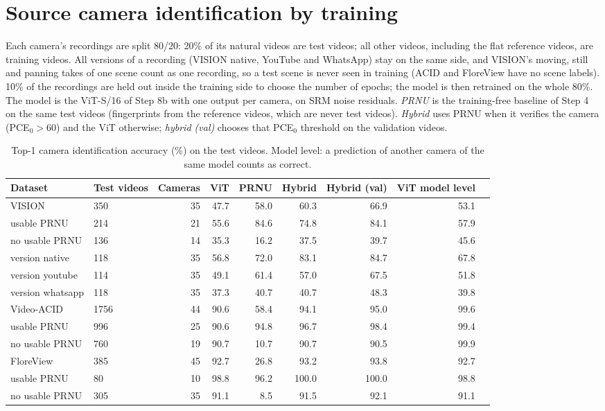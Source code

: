 \documentclass[11pt,a4paper]{article}
\begin{document}
\section{Source camera identification by training}
Each camera's recordings are split 80/20: 20\% of its natural videos are test videos; all other videos, including the flat reference videos, are training videos. All versions of a recording (VISION native, YouTube and WhatsApp) stay on the same side, and VISION's moving, still and panning takes of one scene count as one recording, so a test scene is never seen in training (ACID and FloreView have no scene labels). 10\% of the recordings are held out inside the training side to choose the number of epochs; the model is then retrained on the whole 80\%. The model is the ViT-S/16 of Step 8b with one output per camera, on SRM noise residuals. \emph{PRNU} is the training-free baseline of Step 4 on the same test videos (fingerprints from the reference videos, which are never test videos). \emph{Hybrid} uses PRNU when it verifies the camera (PCE$_0>60$) and the ViT otherwise; \emph{hybrid (val)} chooses that PCE$_0$ threshold on the validation videos.
\begin{table}[H]\centering\small\setlength{\tabcolsep}{4pt}\caption{Top-1 camera identification accuracy (\%) on the test videos. Model level: a prediction of another camera of the same model counts as correct.}\begin{tabular}{llrrrrrrr}\toprule Dataset & Test videos & Cameras & ViT & PRNU & Hybrid & Hybrid (val) & ViT model level \\\midrule
VISION & 350 & 35 & 47.7 & 58.0 & 60.3 & 66.9 & 53.1 \\
\quad usable PRNU & 214 & 21 & 55.6 & 84.6 & 74.8 & 84.1 & 57.9 \\
\quad no usable PRNU & 136 & 14 & 35.3 & 16.2 & 37.5 & 39.7 & 45.6 \\
\quad version native & 118 & 35 & 56.8 & 72.0 & 83.1 & 84.7 & 67.8 \\
\quad version youtube & 114 & 35 & 49.1 & 61.4 & 57.0 & 67.5 & 51.8 \\
\quad version whatsapp & 118 & 35 & 37.3 & 40.7 & 40.7 & 48.3 & 39.8 \\
\midrule
Video-ACID & 1756 & 44 & 90.6 & 58.4 & 94.1 & 95.0 & 99.6 \\
\quad usable PRNU & 996 & 25 & 90.6 & 94.8 & 96.7 & 98.4 & 99.4 \\
\quad no usable PRNU & 760 & 19 & 90.7 & 10.7 & 90.7 & 90.5 & 99.9 \\
\midrule
FloreView & 385 & 45 & 92.7 & 26.8 & 93.2 & 93.8 & 92.7 \\
\quad usable PRNU & 80 & 10 & 98.8 & 96.2 & 100.0 & 100.0 & 98.8 \\
\quad no usable PRNU & 305 & 35 & 91.1 & 8.5 & 91.5 & 92.1 & 91.1 \\
\bottomrule\end{tabular}\end{table}
\end{document}
